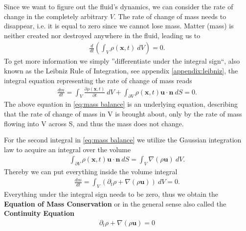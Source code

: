 Since we want to figure out the fluid's dynamics, we can consider the rate
of change in the completely arbitrary $V$. The rate of change of mass needs to
disappear, i.e. it is equal to zero since we cannot lose mass. Matter (mass) is
neither created nor destroyed anywhere in the fluid, leading us to
\begin{align}
    \frac{d}{dt}\left( \int_V \rho(\mathbf{x}, t)\ dV \right) = 0.
\end{align}
To get more information we simply ''differentiate under the integral
sign``, also known as the Leibniz Rule of Integration, see appendix
\ref{appendix:leibniz}, the integral equation representing the rate of change
of mass reads
\begin{align}\label{eq:mass balance}
    \frac{dm}{dt} = \int_V \frac{\partial \rho(\mathbf{x}, t)}{\partial t}\ dV
    +\int_{\partial V} \rho(\mathbf{x}, t) \mathbf{u}\cdot\mathbf{n}\ dS
    = 0.
\end{align}
The above equation in \ref{eq:mass balance} is an underlying equation, describing that the rate of
change of mass in V is brought about, only by the rate of mass flowing into
V across S, and thus the mass does not change.

For the second integral in \ref{eq:mass balance} we utilize the Gaussian
integration law to acquire an integral over the volume
\begin{align}
    \int_{\partial V} \rho(\mathbf{x}, t) \mathbf{u} \cdot \mathbf{n} \ dS =
    \int_V \nabla (\rho \mathbf{u})\ dV.
\end{align}
Thereby we can put everything inside the volume integral
\begin{align}
    \frac{d m}{dt} = \int_V \left(\partial_t \rho + \nabla(\rho \mathbf{u}) \right) \ dV = 0.
\end{align}
Everything under the integral sign needs to be zero, thus we obtain
the \textbf{Equation of Mass Conservation} or in the general sense also
called the \textbf{Continuity Equation}
\begin{align}\label{eq:continuity}
    \partial_t \rho + \nabla(\rho \mathbf{u}) = 0
\end{align}

